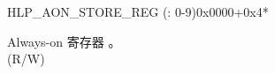 \begin{register}{H}{LP\_AON\_STORE\_REG (: 0-9)}{0x0000+0x4*}\label{regdesc:LPAONSTORENREG}
%
\regnewline%
\begin{regdesc}\begin{reglist}
\label{fielddesc:LPAONSTOREN}\item [LP\_AON\_STORE\regindex{n}] Always-on 寄存器 。 \\(R/W)
\end{reglist}\end{regdesc}
\end{register}
